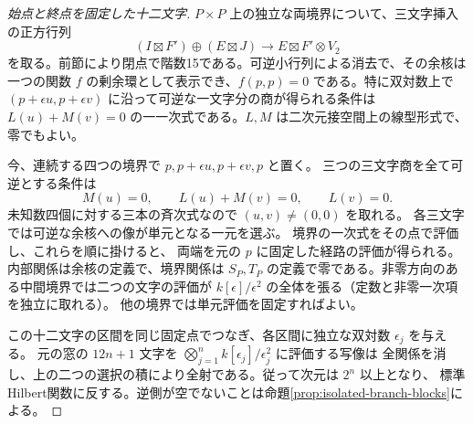 \begin{proof}[始点と終点を固定した十二文字]
$P\times P$ 上の独立な両境界について、三文字挿入の正方行列
\[
 (I\boxtimes F')\oplus(E\boxtimes J)\longrightarrow E\boxtimes F'\otimes V_2
\]
を取る。前節により閉点で階数15である。可逆小行列による消去で、その余核は一つの関数 $f$
の剰余環として表示でき、$f(p,p)=0$ である。特に双対数上で
$(p+\epsilon u,p+\epsilon v)$ に沿って可逆な一文字分の商が得られる条件は
$L(u)+M(v)=0$ の一一次式である。$L,M$ は二次元接空間上の線型形式で、零でもよい。

今、連続する四つの境界で $p, p+\epsilon u,p+\epsilon v,p$ と置く。
三つの三文字商を全て可逆とする条件は
\[
           M(u)=0,\qquad L(u)+M(v)=0,\qquad L(v)=0 .
\]
未知数四個に対する三本の斉次式なので $(u,v)\ne(0,0)$ を取れる。
各三文字では可逆な余核への像が単元となる一元を選ぶ。
境界の一次式をその点で評価し、これらを順に掛けると、
両端を元の $p$ に固定した経路の評価が得られる。内部関係は余核の定義で、境界関係は
$S_P,T_P$ の定義で零である。非零方向のある中間境界では二つの文字の評価が
$k[\epsilon]/\epsilon^2$ の全体を張る（定数と非零一次項を独立に取れる）。
他の境界では単元評価を固定すればよい。

この十二文字の区間を同じ固定点でつなぎ、各区間に独立な双対数 $\epsilon_j$ を与える。
元の窓の $12n+1$ 文字を $\bigotimes_{j=1}^n k[\epsilon_j]/\epsilon_j^2$ に評価する写像は
全関係を消し、上の二つの選択の積により全射である。従って次元は $2^n$ 以上となり、
標準Hilbert関数に反する。逆側が空でないことは命題\ref{prop:isolated-branch-blocks}による。
\end{proof}
